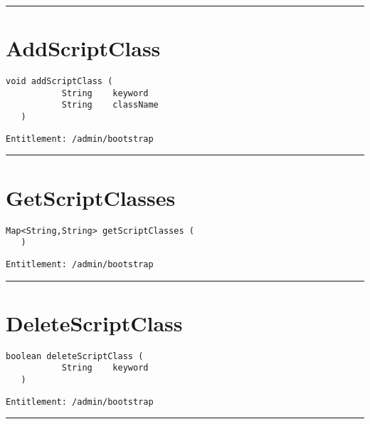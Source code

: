 \rule{12cm}{2pt}
\section{AddScriptClass}
\label{Api:AddScriptClass}
\begin{lstlisting}[style=nonumbers]
   void addScriptClass (
           String    keyword
           String    className
   )
\end{lstlisting}
\begin{Verbatim}[formatcom=\color{Maroon}]
  Entitlement: /admin/bootstrap
\end{Verbatim}



\rule{12cm}{2pt}
\section{GetScriptClasses}
\label{Api:GetScriptClasses}
\begin{lstlisting}[style=nonumbers]
   Map<String,String> getScriptClasses (
   )
\end{lstlisting}
\begin{Verbatim}[formatcom=\color{Maroon}]
  Entitlement: /admin/bootstrap
\end{Verbatim}



\rule{12cm}{2pt}
\section{DeleteScriptClass}
\label{Api:DeleteScriptClass}
\begin{lstlisting}[style=nonumbers]
   boolean deleteScriptClass (
           String    keyword
   )
\end{lstlisting}
\begin{Verbatim}[formatcom=\color{Maroon}]
  Entitlement: /admin/bootstrap
\end{Verbatim}



\rule{12cm}{2pt}
